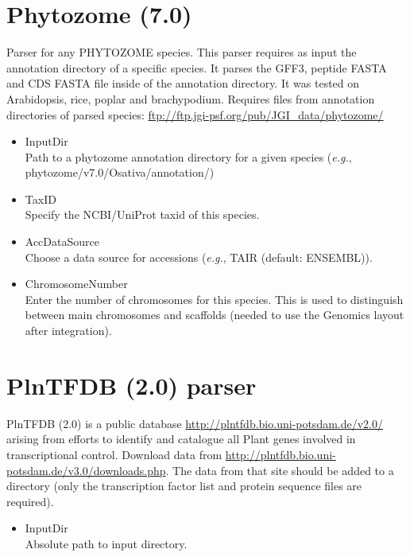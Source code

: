\section{Phytozome (7.0)}
Parser for any PHYTOZOME species.
This parser requires as input the annotation directory of a specific species. 
It parses the GFF3, peptide FASTA and CDS FASTA file inside of the annotation directory. 
It was tested on Arabidopsis, rice, poplar and brachypodium.
Requires files from annotation directories of parsed species: 
\url{ftp://ftp.jgi-psf.org/pub/JGI_data/phytozome/}
\begin{itemize}
  \item{InputDir}\\
  Path to a phytozome annotation directory for a given species ({\it{e.g.}}, phytozome/v7.0/Osativa/annotation/)
  \item{TaxID}\\
  Specify the NCBI/UniProt taxid of this species.
  \item{AccDataSource}\\
  Choose a data source for accessions ({\it{e.g.}}, TAIR (default: ENSEMBL)).
  \item{ChromosomeNumber}\\
  Enter the number of chromosomes for this species. 
  This is used to distinguish between main chromosomes and scaffolds (needed to use the Genomics layout after integration).
\end{itemize}
   
\section{PlnTFDB (2.0) parser}
PlnTFDB (2.0) is a public database \url{http://plntfdb.bio.uni-potsdam.de/v2.0/} arising from efforts to identify and catalogue
all Plant genes involved in transcriptional control. 
Download data from \url{http://plntfdb.bio.uni-potsdam.de/v3.0/downloads.php}.
The data from that site should be added to a directory (only the transcription factor list and protein sequence files are required).
\begin{itemize}
  \item{InputDir}\\
  Absolute path to input directory.
\end{itemize}
    
